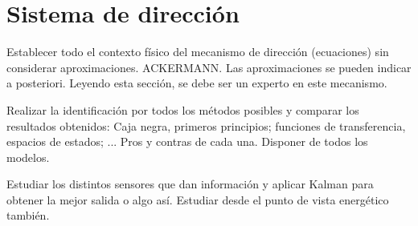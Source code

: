 \chapter{Sistema de dirección}
Establecer todo el contexto físico del mecanismo de dirección (ecuaciones) sin considerar aproximaciones. ACKERMANN. Las aproximaciones se pueden indicar a posteriori. Leyendo esta sección, se debe ser un experto en este mecanismo.

Realizar la identificación por todos los métodos posibles y comparar los resultados obtenidos: Caja negra, primeros principios; funciones de transferencia, espacios de estados; ... Pros y contras de cada una. Disponer de todos los modelos.

Estudiar los distintos sensores que dan información y aplicar Kalman para obtener la mejor salida o algo así. Estudiar desde el punto de vista energético también.
\afterpage{\blankpage}